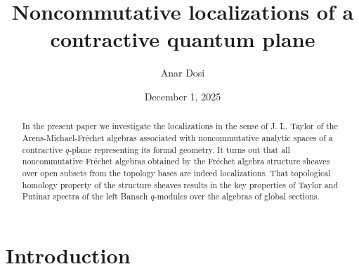 \documentclass[12pt,reqno]{amsart}%
\theoremstyle{plain}
\numberwithin{theorem}{section} \numberwithin{equation}{section}
\numberwithin{lemma}{section}
\numberwithin{remark}{section}
\numberwithin{example}{section}
\numberwithin{proposition}{section}
\numberwithin{definition}{section}
\numberwithin{corollary}{section}
\begin{document}
\title[Noncommutative localizations]{Noncommutative localizations of a contractive quantum plane}
\author{Anar Dosi}
\address{College of Mathematical Sciences, Harbin Engineering University, Nangang
District, Harbin, 150001, China}
\date{December 1, 2025}

\begin{abstract}
In the present paper we investigate the localizations in the sense of J. L.
Taylor of the Arens-Michael-Fr\'{e}chet algebras associated with
noncommutative analytic spaces of a contractive $q$-plane representing its
formal geometry. It turns out that all noncommutative Fr\'{e}chet algebras
obtained by the Fr\'{e}chet algebra structure sheaves over open subsets from
the topology bases are indeed localizations. That topological homology
property of the structure sheaves results in the key properties of Taylor and
Putinar spectra of the left Banach $q$-modules over the algebras of global sections.

\end{abstract}
\maketitle


\section{Introduction\label{secInt}}
\end{document}
